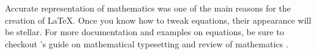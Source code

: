 Accurate representation of mathematics was one of the main reasons for the creation of \LaTeX. Once you know how to tweak equations, their appearance will be stellar. For more documentation and examples on equations, be sure to checkout 's guide on mathematical typesetting and review of mathematics \parencites{book:voss-maths,web:ctan-voss-mathmode}.